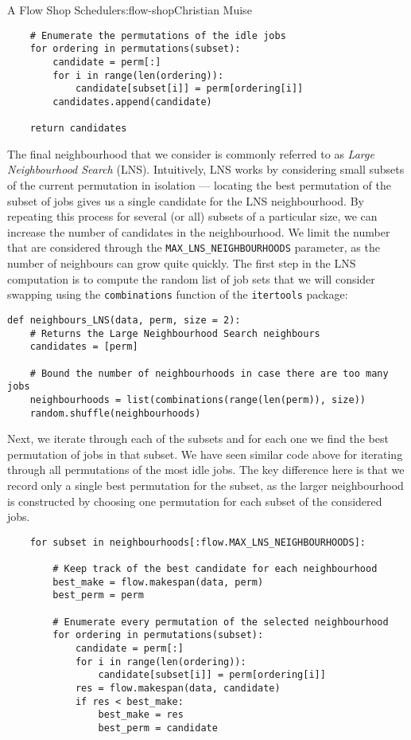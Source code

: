 \begin{aosachapter}{A Flow Shop Scheduler}{s:flow-shop}{Christian Muise}
\begin{verbatim}
    # Enumerate the permutations of the idle jobs
    for ordering in permutations(subset):
        candidate = perm[:]
        for i in range(len(ordering)):
            candidate[subset[i]] = perm[ordering[i]]
        candidates.append(candidate)

    return candidates
\end{verbatim}

The final neighbourhood that we consider is commonly referred to as
\emph{Large Neighbourhood Search} (LNS). Intuitively, LNS works by
considering small subsets of the current permutation in isolation ---
locating the best permutation of the subset of jobs gives us a single
candidate for the LNS neighbourhood. By repeating this process for
several (or all) subsets of a particular size, we can increase the
number of candidates in the neighbourhood. We limit the number that are
considered through the \texttt{MAX\_LNS\_NEIGHBOURHOODS} parameter, as
the number of neighbours can grow quite quickly. The first step in the
LNS computation is to compute the random list of job sets that we will
consider swapping using the \texttt{combinations} function of the
\texttt{itertools} package:

\begin{verbatim}
def neighbours_LNS(data, perm, size = 2):
    # Returns the Large Neighbourhood Search neighbours
    candidates = [perm]

    # Bound the number of neighbourhoods in case there are too many jobs
    neighbourhoods = list(combinations(range(len(perm)), size))
    random.shuffle(neighbourhoods)
\end{verbatim}

Next, we iterate through each of the subsets and for each one we find
the best permutation of jobs in that subset. We have seen similar code
above for iterating through all permutations of the most idle jobs. The
key difference here is that we record only a single best permutation for
the subset, as the larger neighbourhood is constructed by choosing one
permutation for each subset of the considered jobs.

\begin{verbatim}
    for subset in neighbourhoods[:flow.MAX_LNS_NEIGHBOURHOODS]:

        # Keep track of the best candidate for each neighbourhood
        best_make = flow.makespan(data, perm)
        best_perm = perm

        # Enumerate every permutation of the selected neighbourhood
        for ordering in permutations(subset):
            candidate = perm[:]
            for i in range(len(ordering)):
                candidate[subset[i]] = perm[ordering[i]]
            res = flow.makespan(data, candidate)
            if res < best_make:
                best_make = res
                best_perm = candidate


\end{verbatim}
\end{aosachapter}
